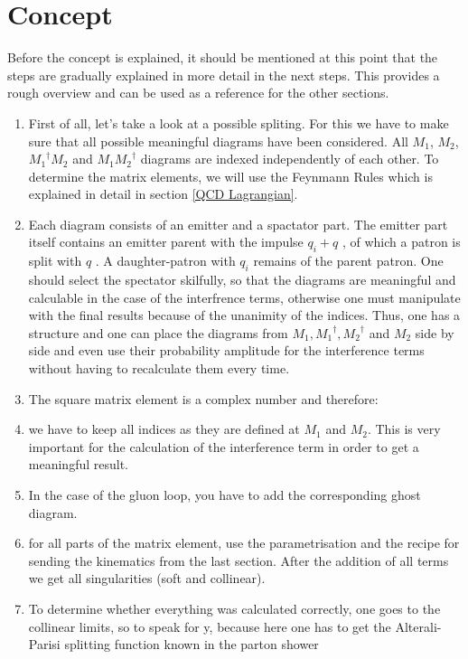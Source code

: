 \section*{Concept}
\label{Concept}
Before the concept is explained, it should be mentioned at this point that the steps are gradually explained in more detail in the next steps. This provides a rough overview and can be used as a reference for the other sections.
\renewcommand{\labelenumi}{\roman{enumi})}
\begin{enumerate}
\item First of all, let's take a look at a possible spliting. For this we have to make sure that all possible meaningful diagrams have been considered.
All $ M_1 $, $ M_2 $, $ {M_1}^{\dagger} M_2 $ and $ M_1{M_2}^{\dagger}$ diagrams are indexed independently of each other.  To determine the matrix elements, we will use the Feynmann Rules which is explained in detail in section \ref{QCD Lagrangian}.
\item Each diagram consists of an emitter and a spactator part.
The emitter part itself contains an emitter parent with the impulse $ q_i+q $ , of which a patron is split with $ q $ . A daughter-patron with $ q_i $ remains of the parent patron. One should select the spectator skilfully, so that the diagrams are meaningful and calculable in the case of the interfrence terms, otherwise one must manipulate with the final results because of the unanimity of the indices. Thus, one has a structure and one can place the diagrams from $ M_1, {M_1}^{\dagger}, {M_2}^{\dagger}$ and $ M_2 $ side by side and even use their probability amplitude for the interference terms without having to recalculate them every time. 
\item The square matrix element is a complex number and therefore:
\item we have to keep all indices as they are defined at $M_1$ and $M_2$. This is very important for the calculation of the interference term in order to get a meaningful result.
\item In the case of the gluon loop, you have to add the corresponding ghost diagram.
\item for all parts of the matrix element, use the parametrisation and the recipe for sending the kinematics from the last section.
After the addition of all terms we get all singularities (soft and collinear). 
\item To determine whether everything was calculated correctly, one goes to the collinear limits, so to speak for y, because here one has to get the Alterali-Parisi splitting function known in the parton shower
\end{enumerate}